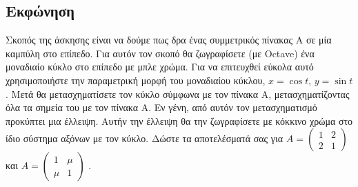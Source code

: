 \documentclass[a4paper,12pt]{article}
\begin{document}
\subsection{Εκφώνηση}
Σκοπός της άσκησης είναι να δούμε πως δρα ένας συμμετρικός πίνακας Α σε μία καμπύλη στο επίπεδο.
Για αυτόν τον σκοπό θα ζωγραφίσετε (με Octave) ένα μοναδιαίο κύκλο στο επίπεδο με μπλε χρώμα.
Για να επιτευχθεί εύκολα αυτό χρησιμοποιήστε την παραμετρική μορφή του μοναδιαίου κύκλου, $x=\cos{t}$,
$y=\sin{t}$. Μετά θα μετασχηματίσετε τον κύκλο σύμφωνα με τον πίνακα Α, μετασχηματίζοντας όλα τα σημεία
του με τον πίνακα Α. Εν γένη, από αυτόν τον μετασχηματισμό προκύπτει μια έλλειψη. Αυτήν την έλλειψη θα την
ζωγραφίσετε με κόκκινο χρώμα στο ίδιο σύστημα αξόνων με τον κύκλο. Δώστε τα αποτελέσματά σας για
$
	A=\begin{pmatrix}
		1 & 2 \\
		2 & 1
	\end{pmatrix}
$
και
$
	A=\begin{pmatrix}
		1   & \mu \\
		\mu & 1
	\end{pmatrix}
$
.
\end{document}
